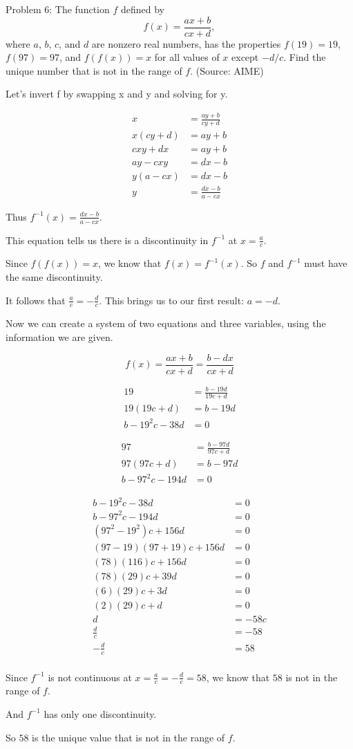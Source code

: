 Problem 6: The function $f$ defined by $$f(x) = \frac{ax + b}{cx + d}, $$where $a$, $b$, $c$, and $d$ are nonzero real numbers, has the properties $f(19) = 19$, $f(97) = 97$, and $f(f(x)) = x$ for all values of $x$ except $-d/c$. Find the unique number that is not in the range of $f$. (Source: AIME)

Let's invert f by swapping x and y and solving for y.

\begin{align*}
x &= \frac{ay + b}{cy + d} \\
x(cy + d) &= ay + b \\
cxy + dx &= ay + b \\
ay - cxy &= dx - b \\
y(a - cx) &= dx - b \\
y &= \frac{dx - b}{a - cx}
\end{align*}

Thus $f^{-1}(x) = \frac{dx - b}{a - cx}$.

This equation tells us there is a discontinuity in $f^{-1}$ at $x = \frac{a}{c}$.

Since $f(f(x)) = x$, we know that $f(x) = f^{-1}(x)$. So $f$ and $f^{-1}$ must have the same discontinuity.

It follows that $\frac{a}{c} = - \frac{d}{c}$. This brings us to our first result: $a = -d$.

Now we can create a system of two equations and three variables, using the information we are given.

$$ f(x) = \frac{ax + b}{cx + d} = \frac{b - dx}{cx + d} $$

\begin{align*}
19 &= \frac{b - 19d}{19c + d} \\
19(19c + d) &= b - 19d \\
b - 19^2c - 38d &= 0
\end{align*}

\begin{align*}
97 &= \frac{b - 97d}{97c + d} \\
97(97c + d) &= b - 97d \\
b - 97^2c - 194d &= 0
\end{align*}

\begin{align*}
b - 19^2c - 38d &= 0 \\
b - 97^2c - 194d &= 0 \\
(97^2 - 19^2)c + 156d &= 0 \\
(97 - 19)(97 + 19)c + 156d &= 0 \\
(78)(116)c + 156d &= 0 \\
(78)(29)c + 39d &= 0 \\
(6)(29)c + 3d &= 0 \\
(2)(29)c + d &= 0 \\
d &= -58c \\
\frac{d}{c} &= -58 \\
-\frac{d}{c} &= 58 \\
\end{align*}

Since $f^{-1}$ is not continuous at $x = \frac{a}{c} = -\frac{d}{c} = 58$, we know that $58$ is not in the range of $f$.

And $f^{-1}$ has only one discontinuity.

So $\boxed{58}$ is the unique value that is not in the range of $f$.
